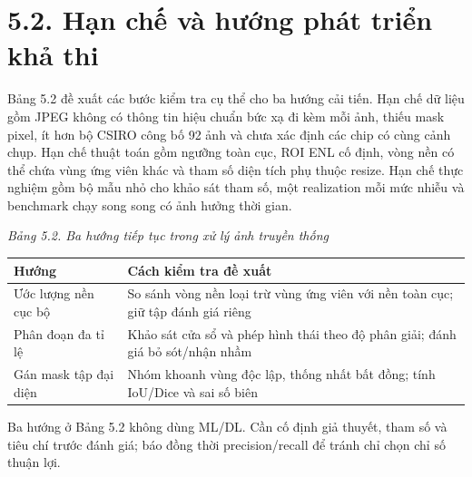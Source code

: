 \documentclass[12pt,a4paper]{extreport}
\begin{document}
\section*{5.2. Hạn chế và hướng phát triển khả thi}
Bảng 5.2 đề xuất các bước kiểm tra cụ thể cho ba hướng cải tiến. Hạn chế dữ liệu gồm JPEG không có thông tin hiệu chuẩn bức xạ đi kèm mỗi ảnh,\allowbreak{} thiếu mask pixel,\allowbreak{} ít hơn bộ CSIRO công bố 92 ảnh và chưa xác định các chip có cùng cảnh chụp. Hạn chế thuật toán gồm ngưỡng toàn cục,\allowbreak{} ROI ENL cố định,\allowbreak{} vòng nền có thể chứa vùng ứng viên khác và tham số diện tích phụ thuộc resize. Hạn chế thực nghiệm gồm bộ mẫu nhỏ cho khảo sát tham số,\allowbreak{} một realization mỗi mức nhiễu và benchmark chạy song song có ảnh hưởng thời gian.
\par
{\fontsize{10.5}{12}\selectfont\textit{Bảng 5.2. Ba hướng tiếp tục trong xử lý ảnh truyền thống}
\begin{longtable}{>{\raggedright\arraybackslash}p{7.693cm}|>{\raggedright\arraybackslash}p{7.693cm}}
\textbf{Hướng} & \textbf{Cách kiểm tra đề xuất}\\\hline
\endhead
Ước lượng nền cục bộ & So sánh vòng nền loại trừ vùng ứng viên với nền toàn cục; giữ tập đánh giá riêng\\\hline
Phân đoạn đa tỉ lệ & Khảo sát cửa sổ và phép hình thái theo độ phân giải; đánh giá bỏ sót/\allowbreak{}nhận nhầm\\\hline
Gán mask tập đại diện & Nhóm khoanh vùng độc lập,\allowbreak{} thống nhất bất đồng; tính IoU/\allowbreak{}Dice và sai số biên\\\hline
\end{longtable}}
Ba hướng ở Bảng 5.2 không dùng ML/\allowbreak{}DL. Cần cố định giả thuyết,\allowbreak{} tham số và tiêu chí trước đánh giá; báo đồng thời precision/\allowbreak{}recall để tránh chỉ chọn chỉ số thuận lợi.
\par
\clearpage
\end{document}
